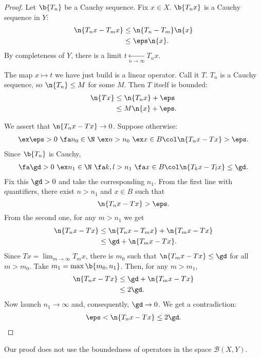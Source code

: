 \begin{proof}
  Let $\b{T_n}$ be a Cauchy sequence.
  Fix $x \in X$.
  $\b{T_n x}$ is a Cauchy sequence in $Y$:
  \begin{align*}
    \n{T_nx - T_mx}
    &\le \n{T_n-T_m}\n{x} \\
    &\le \eps \n{x}.
  \end{align*}
  By completeness of $Y$, there is a limit $t \xleftarrow[n \to \infty]{} T_n x$.
  
  The map $x \mapsto t$ we have just build is a linear operator. Call it $T$.
  $T_n$ is a Cauchy sequence, so $\n{T_n} \le M$ for some $M$.
  Then $T$ itself is bounded:
  \begin{align*}
    \n{Tx}
    &\le \n{T_nx}+ \eps\\
    &\le M \n{x} + \eps.
  \end{align*}
  
  We assert that $\n{T_nx-Tx} \to 0$.
  Suppose otherwise:
  \begin{align*}
    \ex \eps > 0\ \fa n_0 \in \N\ \ex n > n_0\ \ex x \in B \col \n{T_n x - Tx} > \eps.
  \end{align*}
  Since $\b{T_n}$ is Cauchy,
  \begin{align*}
    \fa \gd > 0\ \ex n_1 \in \N\ \fa k, l > n_1\ \fa x \in B \col \n{T_kx-T_lx} \le \gd.
  \end{align*}
  Fix this $\gd > 0$ and take the corresponding $n_1$.
  From the first line with quantifiers, there exist $n > n_1$ and $x \in B$ such that
  $$ \n{T_n x - Tx} > \eps. $$
  From the second one, for any $m > n_1$ we get
  \begin{align*}
    \n{T_n x - Tx}
    &\le \n{T_nx - T_mx} + \n{T_mx-Tx} \\
    &\le \gd + \n{T_mx-Tx}.
  \end{align*}
  Since $Tx = \lim_{m \to \infty} T_mx$, there is $m_0$ such that $\n{T_mx-Tx} \le \gd$ for all $m > m_0$.
  Take $m_1 = \max\b{m_0, n_1}$. Then, for any $m > m_1$,
  \begin{align*}
    \n{T_n x - Tx}
    &\le \gd + \n{T_mx-Tx} \\
    &\le 2\gd.
  \end{align*}
  Now launch $n_1 \to \infty$ and, consequently, $\gd \to 0$. We get a contradiction:
  \begin{align*}
    \eps < \n{T_n x - Tx} \le 2\gd.
  \end{align*}
\end{proof}

\begin{remark}
  Our proof does not use the boundedness of operators in the space $\mathcal{B}(X, Y)$.
\end{remark}

